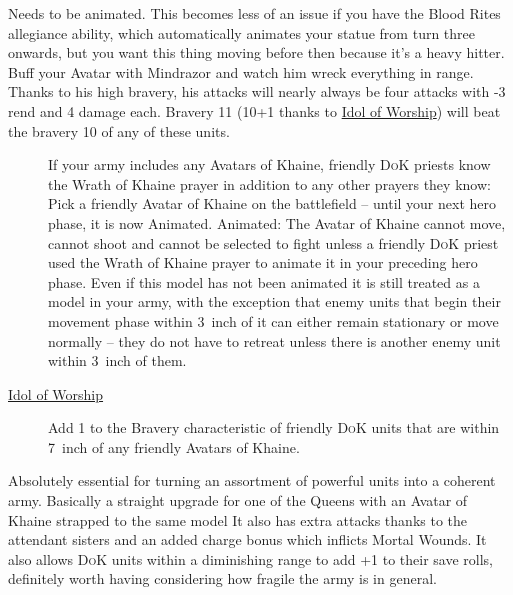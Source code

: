 Needs to be animated. This becomes less of an issue if you have the Blood Rites
allegiance ability, which automatically animates your statue from turn three
onwards, but you want this thing moving before then because it's a heavy
hitter.\\ 
Buff your Avatar with Mindrazor and watch him wreck everything in
range. Thanks to his high bravery, his attacks will nearly always be four
attacks with -3 rend and 4 damage each. Bravery 11 (10+1 thanks to
\hyperref[idol-of-worship]{Idol of Worship}) will beat the bravery 10 of any of
these units.

\begin{description}
    \item [] If your army includes
        any Avatars of Khaine, friendly \textsc{DoK} priests know the Wrath of Khaine
        prayer in addition to any other prayers they know:  Pick a friendly
        Avatar of Khaine on the battlefield – until your next hero phase, it is
        now Animated. Animated: The Avatar of Khaine cannot move, cannot shoot
        and cannot be selected to fight unless a friendly \textsc{DoK}
        priest used the Wrath of Khaine prayer to animate it in your preceding
        hero phase. Even if this model has not been animated it is still
        treated as a model in your army, with the exception that enemy units
        that begin their movement phase within 3~inch of it can either remain
        stationary or move normally -- they do not have to retreat unless there
        is another enemy unit within 3~inch of them.
    \item [{\hyperref[idol-of-worship]{Idol of Worship}}] Add 1 to the Bravery
        characteristic of friendly \textsc{DoK} units that are within 7~inch of any
        friendly Avatars of Khaine.
\end{description}

Absolutely essential for turning an assortment of powerful units into
a coherent army.  Basically a straight upgrade for one of the Queens with an
Avatar of Khaine strapped to the same model It also has extra attacks thanks to
the attendant sisters and an added charge bonus which inflicts Mortal Wounds.
It also allows \textsc{DoK} units within a diminishing range to add +1 to their
save rolls, definitely worth having considering how fragile the army is in
general.

